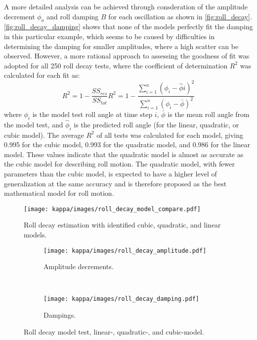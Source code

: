 A more detailed analysis can be achieved through consderation of the amplitude decrement $\phi_a$ and roll damping $B$ for each oscillation as shown in \autoref{fig:roll_decay}. \autoref{fig:roll_decay_damping} shows that none of the models perfectly fit the damping in this particular example, which seems to be caused by difficulties in determining the damping for smaller amplitudes, where a high scatter can be observed.  
However, a more rational approach to assessing the goodness of fit was adopted for all 250 roll decay tests, where the coefficient of determination $R^2$ was calculated for each fit as:  
\begin{equation} \label{eq:R2} 
R^2=1-\frac{SS_{res}}{SS_{tot}} R^2=1-\frac{\sum_{i=1}^{n}(\phi_{i}-\hat{\phi}i)^2}{\sum_{i=1}^{n}(\phi_i-\bar \phi)^2} 
\end{equation} 
where $\phi_i$ is the model test roll angle at time step $i$, $\bar \phi$ is the mean roll angle from the model test, and $\hat{\phi}_i$ is the predicted roll angle (for the linear, quadratic, or cubic model). 
The average $R^2$ of all tests was calculated for each model, giving 0.995 for the cubic model, 0.993 for the quadratic model, and 0.986 for the linear model. These values indicate that the quadratic model is almost as accurate as the cubic model for describing roll motion. The quadratic model, with fewer parameters than the cubic model, is expected to have a higher level of generalization at the same accuracy and is therefore proposed as the best mathematical model for roll motion.
\begin{figure}[h!] \centering \texttt{[image: kappa/images/roll\_decay\_model\_compare.pdf]} 
    \begin{minipage}[t]{5.25in}
    \caption{Roll decay estimation with identified cubic, quadratic, and linear models.}
    \label{fig:roll_decay_compare}
    \end{minipage}
\end{figure}
\begin{figure}[h!] \begin{subfigure}[b]{0.45\textwidth} \centering \texttt{[image: kappa/images/roll\_decay\_amplitude.pdf]} \caption{Amplitude decrements.} \label{fig:roll_decay_amplitude} \end{subfigure} ~ %
\begin{subfigure}[b]{0.45\textwidth} \centering \texttt{[image: kappa/images/roll\_decay\_damping.pdf]} \caption{Dampings.} \label{fig:roll_decay_damping} \end{subfigure} \caption{Roll decay model test, linear-, quadratic-, and cubic-model.} \label{fig:roll_decay} \end{figure}
